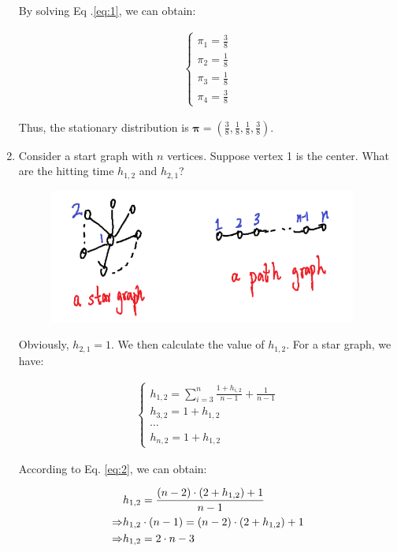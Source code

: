 \begin{problem}[30 points]
\begin{enumerate}
  By solving Eq .\eqref{eq:1}, we can obtain:

  \begin{align}
  \begin{cases}
    \pi_1 = \frac{3}{8}\\
    \pi_2 = \frac{1}{8}\\
    \pi_3 = \frac{1}{8}\\
    \pi_4 = \frac{3}{8}
  \end{cases}
  \end{align}

  Thus, the stationary distribution is $\mathbf{\pi} = (\frac{3}{8}, \frac{1}{8},\frac{1}{8}, \frac{3}{8})$.
      
  \item Consider a start graph with $n$ vertices. Suppose vertex 1 is the center. What are the hitting time $h_{1,2}$ and $h_{2,1}$?
   \begin{figure}[H]
      \centering
 \includegraphics[width=4in]{images/1234.png}
\end{figure} 
  
  \Answer
  
  Obviously, $h_{2,1} = 1$. We then calculate the value of $h_{1,2}$. For a star graph, we have:

  \begin{align}\label{eq:2}
  \begin{cases}
    h_{1,2} = \sum_{i=3}^{n}\frac{1+h_{i,2}}{n-1} + \frac{1}{n-1}\\
    h_{3,2} = 1+h_{1,2}\\
    \cdots\\
    h_{n,2} = 1+h_{1,2}
  \end{cases}
  \end{align}

  According to Eq. \eqref{eq:2}, we can obtain:

  \begin{align}
    & h_{1,2} = \frac{(n-2) \cdot (2+h_{1,2}) + 1}{n-1} \notag\\
   \Rightarrow & h_{1,2} \cdot (n-1) = (n-2) \cdot (2+h_{1,2}) +1 \notag\\
   \Rightarrow &  h_{1,2} = 2 \cdot n-3  
  \end{align}
  

\end{enumerate}
\end{problem}
